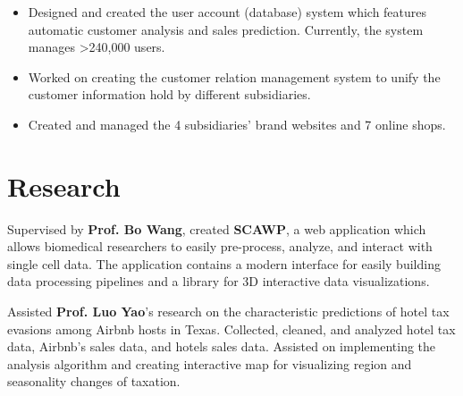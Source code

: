 \documentclass[letterpaper]{deedy-resume} %
\begin{document}
\begin{minipage}[t]{0.66\textwidth}
\sectionspace %


\begin{itemize}[noitemsep,topsep=0pt,leftmargin=*]
\item Designed and created the user account (database) system which features automatic customer analysis and sales prediction. Currently, the system manages >240,000 users.
\item Worked on creating the customer relation management system to unify the customer information hold by different subsidiaries.
\item Created and managed the 4 subsidiaries' brand websites and 7 online shops.
\end{itemize}

\sectionspace %


\section{Research}


Supervised by \textbf{Prof. Bo Wang}, created \textbf{SCAWP}, a web application which allows biomedical researchers to easily pre-process, analyze, and interact with single cell data. The application contains a modern interface for easily building data processing pipelines and a library for 3D interactive data visualizations. 

\sectionspace %



Assisted \textbf{Prof. Luo Yao}'s research on the characteristic predictions of hotel tax evasions among Airbnb hosts in Texas. Collected, cleaned, and analyzed hotel tax data, Airbnb's sales data, and hotels sales data. Assisted on implementing the analysis algorithm and creating interactive map for visualizing region and seasonality changes of taxation. 

\sectionspace %



\end{minipage} %
\end{document}
